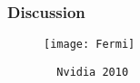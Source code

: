 \documentclass{beamer}
\begin{document}
\begin{frame}
\begin{enumerate}
  \end{enumerate}
\end{frame}

\begin{frame}[fragile]
  \frametitle{Discussion}

  \begin{figure}[h]
  \center
  \texttt{[image: Fermi]}
  {\tiny
  \begin{verbatim}
  Nvidia 2010
  \end{verbatim}
  }
  \end{figure}
\end{frame}
\end{document}
